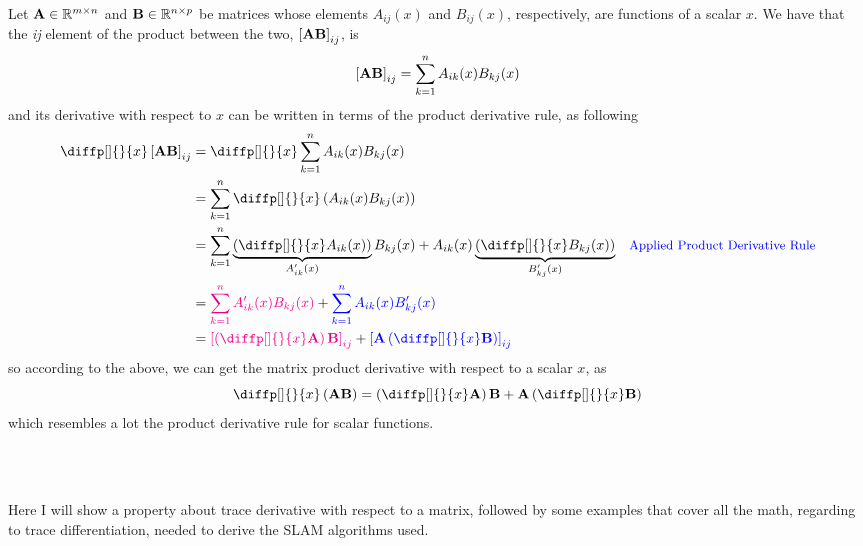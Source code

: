 \documentclass[12pt]{article}
\begin{document}
 \\
Let $\mat{A} \in \R^{m\times n}$ and $\mat{B} \in \R^{n\times p}$ be matrices whose elements $A_{ij}(x)$ and $B_{ij}(x)$, respectively, are functions of a scalar $x$. We have that the \textit{ij} element of the product between the two, $\brac{\mat{A B}}_{ij}$, is
\begin{equation*}
    \brac{\mat{A B}}_{ij} = \Sum[k]{1}{n} A_{ik}(x) B_{kj}(x)
\end{equation*}
and its derivative with respect to $x$ can be written in terms of the product derivative rule, as following
\begin{equation*}
\begin{aligned}
    \diffp[]{}{x} \brac{\mat{A B}}_{ij} &= \diffp[]{}{x} \Sum[k]{1}{n} A_{ik}(x) B_{kj}(x) \\
    &= \Sum[k]{1}{n} \diffp[]{}{x} \parentheses{A_{ik}(x) B_{kj}(x)} \\
    &= \Sum[k]{1}{n} \underbrace{\parentheses{\diffp[]{}{x}A_{ik}(x)}}_{A'_{ik}(x)} B_{kj}(x) + A_{ik}(x) \underbrace{\parentheses{\diffp[]{}{x} B_{kj}(x)}}_{B'_{kj}(x)} & \text{\small \blue{Applied Product Derivative Rule}} \\
    &= \magenta{\Sum[k]{1}{n} A'_{ik}(x) B_{kj}(x)} + 
    \blue{\Sum[k]{1}{n} A_{ik}(x) B'_{kj}(x)}\\
    &= \magenta{\brac{\parentheses{\diffp[]{}{x}\mat{A}} \mat{B}}_{ij}} + \blue{\brac{\mat{A} \parentheses{\diffp[]{}{x} \mat{B}}}_{ij}}
\end{aligned}
\end{equation*}
so according to the above, we can get the matrix product derivative with respect to a scalar $x$, as
\begin{equation}
    \diffp[]{}{x}\parentheses{\mat{A B}} = \parentheses{\diffp[]{}{x} \mat{A}} \mat{B} + \mat{A} \parentheses{\diffp[]{}{x} \mat{B}}
    \label{eq:matrix-prod-derivative-with-respect-to-scalar}
\end{equation}
which resembles a lot the product derivative rule for scalar functions.

\\

\\
Here I will show a property about trace derivative with respect to a matrix, followed by some examples that cover all the math, regarding to trace differentiation, needed to derive the SLAM algorithms used.
\end{document}
